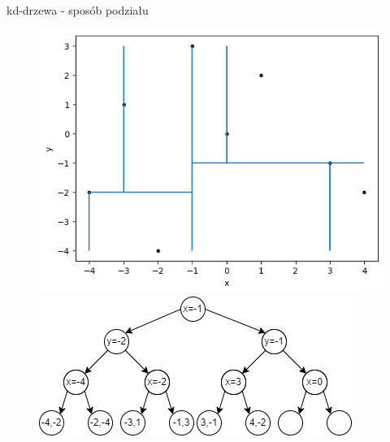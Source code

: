 \documentclass[aspectratio=169,dvipsnames]{beamer}
\begin{document}
\begin{frame}{kd-drzewa - sposób podziału}
    \begin{figure}[H]
        \centering
          \begin{minipage}{0.5\textwidth}
            \centering
            \includegraphics[width=\linewidth]{images/plots/8.png}
          \end{minipage}%
          \begin{minipage}{0.5\textwidth}
            \centering
            \includegraphics[width=\linewidth]{images/trees/11.drawio.png}
          \end{minipage}
    \end{figure}
\end{frame}
\end{document}

